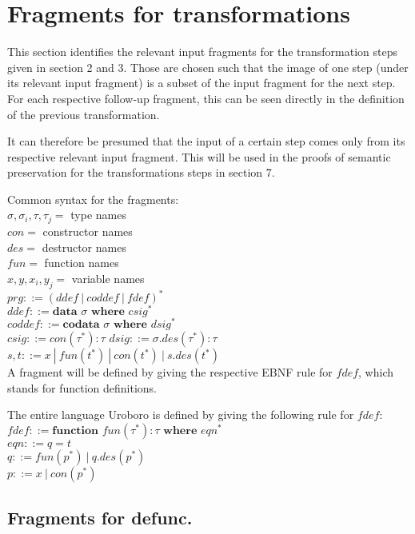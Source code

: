 \documentclass[11pt]{article} %
\begin{document}
\section{Fragments for transformations}

This section identifies the relevant input fragments for the transformation steps given in section 2 and 3. Those are chosen such that the image of one step (under its relevant input fragment) is a subset of the input fragment for the next step. For each respective follow-up fragment, this can be seen directly in the definition of the previous transformation.

It can therefore be presumed that the input of a certain step comes only from its respective relevant input fragment. This will be used in the proofs of semantic preservation for the transformations steps in section 7.

Common syntax for the fragments:\\
$\sigma, \sigma_i, \tau, \tau_j = $ type names\\
$con = $ constructor names\\
$des = $ destructor names\\
$fun = $ function names\\
$x, y, x_i, y_j = $ variable names\\
$prg ::= (ddef ~ | ~ coddef ~ | ~  fdef)^*$\\
$ddef ::= \textbf{data } \sigma \textbf{ where } csig^*$\\
$coddef ::= \textbf{codata } \sigma \textbf{ where } dsig^*$\\
$csig ::= con(\tau^*): \tau$
$dsig ::= \sigma.des(\tau^*): \tau$
$s, t ::= x ~ | ~ fun(t^*) ~ | ~ con(t^*) ~ | ~ s.des(t^*)$\\

A fragment will be defined by giving the respective EBNF rule for $fdef$, which stands for function definitions.

The entire language Uroboro is defined by giving the following rule for $fdef$:\\
$fdef ::= \textbf{function } fun(\tau^*): \tau \textbf{ where } eqn^*$\\
$eqn ::= q = t$\\
$q ::= fun(p^*) ~ | ~ q.des(p^*)$\\
$p ::= x ~ | ~ con(p^*) $\\

\subsection{Fragments for defunc.}
\end{document}

